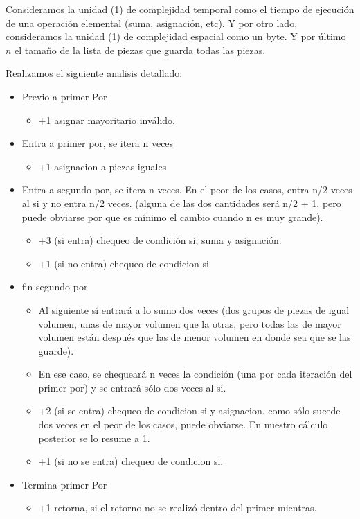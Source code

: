 \documentclass{article}
\begin{document}
Consideramos la unidad (1) de complejidad temporal como el tiempo de ejecución de una operación elemental (suma, asignación, etc). 
Y por otro lado, consideramos la unidad (1) de complejidad espacial como un byte. Y por último \(n\) el tamaño de la lista de piezas que guarda todas las piezas.

Realizamos el siguiente analisis detallado:

\begin{itemize}
    \item Previo a primer Por
    \begin{itemize}
        \item +1 asignar mayoritario inválido.
    \end{itemize}
    \item Entra a primer por, se itera n veces
    \begin{itemize}
        \item +1 asignacion a piezas iguales
    \end{itemize}
    \item Entra a segundo por, se itera n veces. En el peor de los casos, entra n/2 veces al si y no entra n/2 veces. (alguna de las dos cantidades será n/2 + 1, pero puede obviarse por que es mínimo el cambio cuando n es muy grande).
    \begin{itemize}
        \item +3 (si entra) chequeo de condición si, suma y asignación. 
        \item +1 (si no entra) chequeo de condicion si       
    \end{itemize}
    \item fin segundo por
    \begin{itemize}
        \item Al siguiente sí entrará a lo sumo dos veces (dos grupos de piezas de igual volumen, unas de mayor volumen que la otras, pero todas las de mayor volumen están después que las de menor volumen en donde sea que se las guarde).
        \item En ese caso, se chequeará n veces la condición (una por cada iteración del primer por) y se entrará sólo dos veces al si.
        \item +2 (si se entra) chequeo de condicion si y asignacion. como sólo sucede dos veces en el peor de los casos, puede obviarse. En nuestro cálculo posterior se lo resume a 1.
        \item +1 (si no se entra) chequeo de condicion si.
    \end{itemize}
    \item Termina primer Por
    \begin{itemize}
        \item +1 retorna, si el retorno no se realizó dentro del primer mientras.
    \end{itemize}

\end{itemize}
\end{document}
